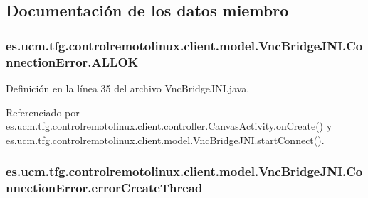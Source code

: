 \subsection{Documentación de los datos miembro}
\hypertarget{enumes_1_1ucm_1_1tfg_1_1controlremotolinux_1_1client_1_1model_1_1VncBridgeJNI_1_1ConnectionError_a8930d5ec0d2c18eb0ddff23fa412fa4e}{
\subsubsection[{A\-L\-L\-O\-K}]{\setlength{\rightskip}{0pt plus 5cm}es.\-ucm.\-tfg.\-controlremotolinux.\-client.\-model.\-Vnc\-Bridge\-J\-N\-I.\-Connection\-Error.\-A\-L\-L\-O\-K}}\label{enumes_1_1ucm_1_1tfg_1_1controlremotolinux_1_1client_1_1model_1_1VncBridgeJNI_1_1ConnectionError_a8930d5ec0d2c18eb0ddff23fa412fa4e}


Definición en la línea 35 del archivo Vnc\-Bridge\-J\-N\-I.\-java.



Referenciado por es.\-ucm.\-tfg.\-controlremotolinux.\-client.\-controller.\-Canvas\-Activity.\-on\-Create() y es.\-ucm.\-tfg.\-controlremotolinux.\-client.\-model.\-Vnc\-Bridge\-J\-N\-I.\-start\-Connect().

\hypertarget{enumes_1_1ucm_1_1tfg_1_1controlremotolinux_1_1client_1_1model_1_1VncBridgeJNI_1_1ConnectionError_a5e2c7dc8996340be3fbaf56eafe9cc83}{
\subsubsection[{error\-Create\-Thread}]{\setlength{\rightskip}{0pt plus 5cm}es.\-ucm.\-tfg.\-controlremotolinux.\-client.\-model.\-Vnc\-Bridge\-J\-N\-I.\-Connection\-Error.\-error\-Create\-Thread}}\label{enumes_1_1ucm_1_1tfg_1_1controlremotolinux_1_1client_1_1model_1_1VncBridgeJNI_1_1ConnectionError_a5e2c7dc8996340be3fbaf56eafe9cc83}


